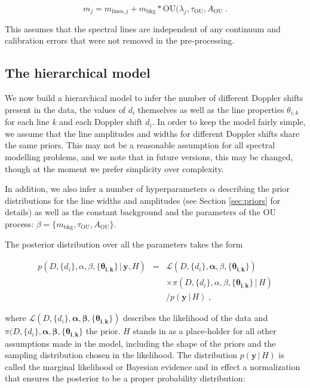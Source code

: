 \documentclass[12pt]{emulateapj}
\newcommand{\given}{\,|\,}
\newcommand{\counts}{y}
\newcommand{\pars}{\theta}
\newcommand{\mean}{m}
\newcommand{\likelihood}{{\mathcal L}}
\newcommand{\bkg}{\mathrm{bkg}}
\begin{document}
\begin{equation}
\label{eqn:modelflux}
m_j = m_{\mathrm{lines},j} + m_{\mathrm{bkg}}*\mathrm{OU}(\lambda_j, \tau_{\mathrm{OU}}, A_{\mathrm{OU}} \; .
\end{equation}

\noindent This assumes that the spectral lines are independent of any continuum and calibration errors that were not removed in the pre-processing. 

\subsection{The hierarchical model}

We now build a hierarchical model to infer the number of different Doppler shifts present in the data, the values of $d_i$ themselves as well as the line properties ${\pars_{i,k}}$ for each line $k$ and each Doppler shift $d_i$. In order to keep the model fairly simple, we assume that the line amplitudes and widths for different Doppler shifts share the same priors. This may not be a reasonable assumption for all spectral modelling problems, and we note that in future versions, this may be changed, though at the moment we prefer simplicity over complexity. 

In addition, we also infer a number of hyperparameters $\alpha$ describing the prior distributions for the line widths and amplitudes (see Section \ref{sec:priors} for details) as well as the constant background and the parameters of the OU process: $\beta = \{\mean_{\bkg}, \tau_{\mathrm{OU}}, A_{\mathrm{OU}}\}$.

The posterior distribution over all the parameters takes the form

\begin{eqnarray}
p(D, \{d_i\}, \alpha, \beta, \{\bm{\pars_{i,k}}\} \given  \bm{\counts}, H) & = & \likelihood(D, \{d_i\}, \bm{\alpha}, \beta, \{\bm{\pars_{i,k}}\}) \\\nonumber
					& & \times \pi(D, \{d_i\}, \alpha, \beta, \{\bm{\pars_{i,k}}\} \given H) \\\nonumber
					& &  / p(\bm{\counts} \given H)\; ,
\end{eqnarray} 

\noindent where $\likelihood(D, \{d_i\}, \bm{\alpha}, \bm{\beta}, \{\bm{\pars_{i,k}}\})$ describes the likelihood of the data and $\pi(D, \{d_i\}, \bm{\alpha}, \bm{\beta}, \{\bm{\pars_{i,k}}\} $ the prior. $H$ stands in as a place-holder for all other assumptions made in the model, including the shape of the priors and the sampling distribution chosen in the likelihood. The distribution $p(\bm{\counts} \given H)$ is called the marginal likelihood or Bayesian evidence and in effect a normalization that ensures the posterior to be a proper probability distribution:
\end{document}

